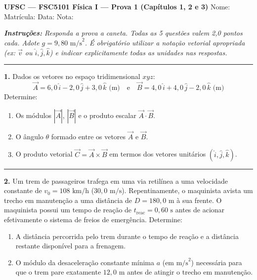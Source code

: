 \documentclass[10pt,a4paper]{article}
\begin{document}
\noindent
\textbf{UFSC --- FSC5101 Física I --- Prova 1 (Capítulos 1, 2 e 3)} \hfill Nome: \underline{\hspace{5.0cm}} Matrícula: \underline{\hspace{2.2cm}} Data: \underline{\hspace{1.3cm}} Nota: \underline{\hspace{1.0cm}}

\vspace{2mm}
\noindent
{\small \textit{\textbf{Instruções:} Responda a prova a caneta. Todas as 5 questões valem 2,0 pontos cada. Adote $g = 9,80\text{ m/s}^2$. É obrigatório utilizar a notação vetorial apropriada (ex: $\vec{v}$ ou $\hat{i}, \hat{j}, \hat{k}$) e indicar explicitamente todas as unidades nas respostas.}}

\vspace{2mm}
\hrule
\vspace{4mm}

\noindent\textbf{1.} Dados os vetores no espaço tridimensional $xyz$:
$$\vec{A} = 6,0\,\hat{i} - 2,0\,\hat{j} + 3,0\,\hat{k}\text{ (m)} \quad \text{e} \quad \vec{B} = 4,0\,\hat{i} + 4,0\,\hat{j} - 2,0\,\hat{k}\text{ (m)}$$
Determine:
\begin{enumerate}[label=\alph*),itemsep=2pt,topsep=3pt]
    \item Os módulos $|\vec{A}|$, $|\vec{B}|$ e o produto escalar $\vec{A} \cdot \vec{B}$.
    \item O ângulo $\theta$ formado entre os vetores $\vec{A}$ e $\vec{B}$.
    \item O produto vetorial $\vec{C} = \vec{A} \times \vec{B}$ em termos dos vetores unitários $(\hat{i}, \hat{j}, \hat{k})$.
\end{enumerate}

\vfill
\hrule
\vspace{4mm}

\noindent\textbf{2.} Um trem de passageiros trafega em uma via retilínea a uma velocidade constante de $v_0 = 108\text{ km/h}$ ($30,0\text{ m/s}$). Repentinamente, o maquinista avista um trecho em manutenção a uma distância de $D = 180,0\text{ m}$ à sua frente. O maquinista possui um tempo de reação de $t_{\text{reac}} = 0,60\text{ s}$ antes de acionar efetivamente o sistema de freios de emergência. Determine:
\begin{enumerate}[label=\alph*),itemsep=2pt,topsep=3pt]
    \item A distância percorrida pelo trem durante o tempo de reação e a distância restante disponível para a frenagem.
    \item O módulo da desaceleração constante mínima $a$ (em $\text{m/s}^2$) necessária para que o trem pare exatamente $12,0\text{ m}$ antes de atingir o trecho em manutenção.
\end{enumerate}
\end{document}
